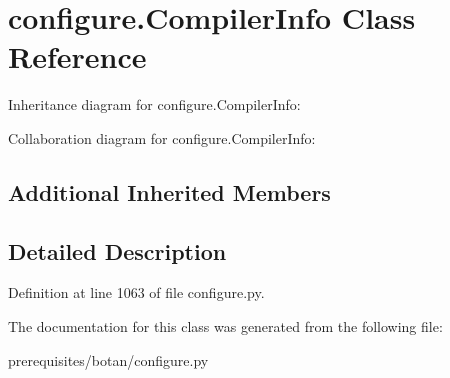\hypertarget{classconfigure_1_1_compiler_info}{}\section{configure.\+Compiler\+Info Class Reference}
\label{classconfigure_1_1_compiler_info}


Inheritance diagram for configure.\+Compiler\+Info\+:


Collaboration diagram for configure.\+Compiler\+Info\+:
\subsection*{Additional Inherited Members}


\subsection{Detailed Description}


Definition at line 1063 of file configure.\+py.



The documentation for this class was generated from the following file\+:\begin{DoxyCompactItemize}
\item 
prerequisites/botan/configure.\+py\end{DoxyCompactItemize}
